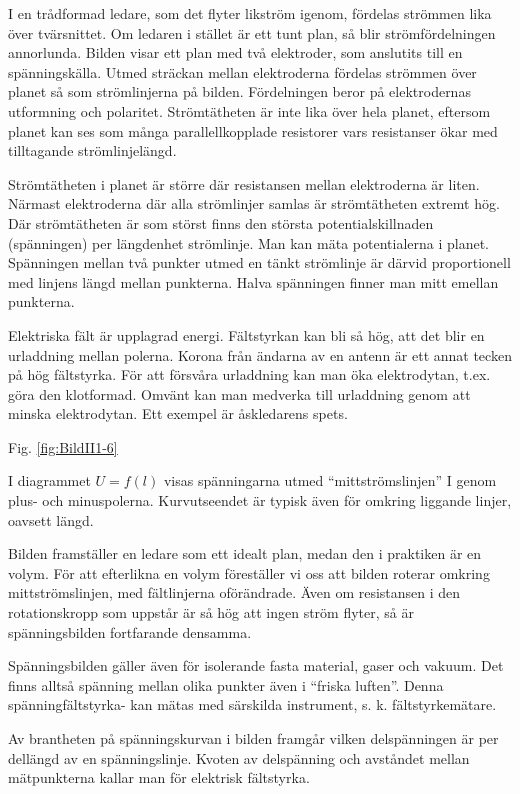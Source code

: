 I en trådformad ledare, som det flyter likström igenom, fördelas strömmen lika
över tvärsnittet. Om ledaren i stället är ett tunt plan, så blir
strömfördelningen annorlunda. Bilden visar ett plan med två elektroder, som
anslutits till en spänningskälla. Utmed sträckan mellan elektroderna fördelas
strömmen över planet så som strömlinjerna på bilden. Fördelningen beror på
elektrodernas utformning och polaritet. Strömtätheten är inte lika över hela
planet, eftersom planet kan ses som många parallellkopplade resistorer vars
resistanser ökar med tilltagande strömlinjelängd.

Strömtätheten i planet är större där resistansen mellan elektroderna är liten.
Närmast elektroderna där alla strömlinjer samlas är strömtätheten extremt hög.
Där strömtätheten är som störst finns den största potentialskillnaden
(spänningen) per längdenhet strömlinje. Man kan mäta potentialerna i planet.
Spänningen mellan två punkter utmed en tänkt strömlinje är därvid proportionell
med linjens längd mellan punkterna. Halva spänningen finner man mitt emellan
punkterna.

Elektriska fält är upplagrad energi. Fältstyrkan kan bli så hög, att det blir
en urladdning mellan polerna. Korona från ändarna av en antenn är ett annat
tecken på hög fältstyrka. För att försvåra urladdning kan man öka elektrodytan,
t.ex. göra den klotformad. Omvänt kan man medverka till urladdning genom att
minska elektrodytan. Ett exempel är åskledarens spets.

Fig. \ref{fig:BildII1-6}

I diagrammet \(U = f(l)\) visas spänningarna utmed ``mittströmslinjen'' I genom
plus- och minuspolerna. Kurvutseendet är typisk även för omkring liggande
linjer, oavsett längd.

Bilden framställer en ledare som ett idealt plan, medan den i praktiken är en
volym. För att efterlikna en volym föreställer vi oss att bilden roterar
omkring mittströmslinjen, med fältlinjerna oförändrade. Även om resistansen i
den rotationskropp som uppstår är så hög att ingen ström flyter, så är
spänningsbilden fortfarande densamma.

Spänningsbilden gäller även för isolerande fasta material, gaser och vakuum.
Det finns alltså spänning mellan olika punkter även i ``friska luften''. Denna
spänningfältstyrka- kan mätas med särskilda instrument, s. k. fältstyrkemätare.

Av brantheten på spänningskurvan i bilden framgår vilken delspänningen är per
dellängd av en spänningslinje. Kvoten av delspänning och avståndet mellan
mätpunkterna kallar man för elektrisk fältstyrka.

